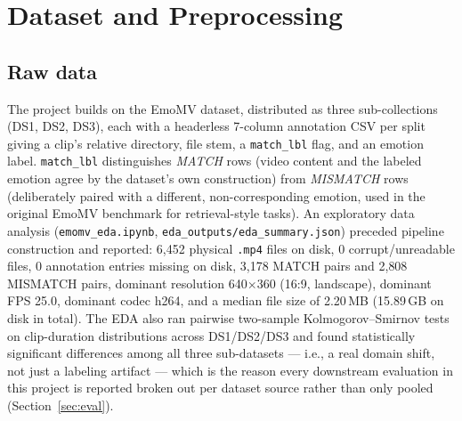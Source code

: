 \documentclass[11pt]{article}
\begin{document}
\section{Dataset and Preprocessing}
\label{sec:data}

\subsection{Raw data}
The project builds on the EmoMV dataset, distributed as three sub-collections (DS1, DS2, DS3),
each with a headerless 7-column annotation CSV per split giving a clip's relative directory, file
stem, a \texttt{match\_lbl} flag, and an emotion label. \texttt{match\_lbl} distinguishes
\emph{MATCH} rows (video content and the labeled emotion agree by the dataset's own construction)
from \emph{MISMATCH} rows (deliberately paired with a different, non-corresponding emotion, used
in the original EmoMV benchmark for retrieval-style tasks). An exploratory data analysis
(\texttt{emomv\_eda.ipynb}, \texttt{eda\_outputs/eda\_summary.json}) preceded pipeline construction
and reported: 6{,}452 physical \texttt{.mp4} files on disk, 0 corrupt/unreadable files, 0
annotation entries missing on disk, 3{,}178 MATCH pairs and 2{,}808 MISMATCH pairs, dominant
resolution 640$\times$360 (16:9, landscape), dominant FPS 25.0, dominant codec h264, and a median
file size of 2.20\,MB (15.89\,GB on disk in total). The EDA also ran pairwise two-sample
Kolmogorov--Smirnov tests on clip-duration distributions across DS1/DS2/DS3 and found
statistically significant differences among all three sub-datasets --- i.e., a real domain shift,
not just a labeling artifact --- which is the reason every downstream evaluation in this project
is reported broken out per dataset source rather than only pooled (Section~\ref{sec:eval}).
\end{document}

